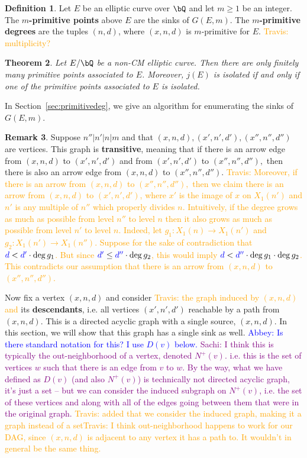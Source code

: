 \documentclass[11pt,reqno]{amsart}
\theoremstyle{plain}
\newtheorem{theorem}{Theorem}%
\theoremstyle{definition}
\newtheorem{remark}[theorem]{Remark}
\newtheorem{definition}[theorem]{Definition}
\newcommand{\Q}{\bQ}
\newcommand{\abbey}[1]{\textcolor{blue}{Abbey: #1}}
\newcommand{\sachi}[1]{\textcolor{purple}{Sachi: #1}}
\newcommand{\travis}[1]{\textcolor{orange}{Travis: #1}}
\newcommand{\abedit}[1]{{\color{blue} #1}}
\newcommand{\sedit}[1]{{\color{purple} #1}}
\begin{document}
\begin{definition}\label{def:mprimitive}
    Let $E$ be an elliptic curve over $\Q$ and let $m\geq 1$ be an integer. The \textbf{$m$-primitive points} above $E$ are the sinks \abedit{of} $G(E,m)$. The \textbf{$m$-primitive degrees} are the tuples $(n,d)$, where $(x,n,d)$ is $m$-primitive for $E$. \travis{multiplicity?}
\end{definition}

\abedit{
\begin{theorem}
    Let $E/\Q$ be a non-CM elliptic curve. Then there are only finitely many primitive points associated to $E$. Moreover, $j(E)$ is isolated if and only if one of the primitive points associated to $E$ is isolated.
\end{theorem}

}
In Section~\ref{sec:primitivedeg}, we give an algorithm for enumerating the sinks of $G(E,m)$.
\begin{remark}\label{Remark:Transitivity}
Suppose $n'' | n' | n | m$ and that $(x,n,d), (x',n',d'), (x'',n'',d'')$ are vertices. This graph is \textbf{transitive}, meaning that if there is an arrow \sedit{edge} from $(x,n,d)$ \sedit{to} $(x',n',d')$ and from $(x',n',d')$ to $(x'',n'',d''),$ then
there is also an arrow \sedit{edge} from $(x,n,d)$ to $(x'',n'',d'')$. \travis{Moreover, if there is an arrow from $(x,n,d)$ to $(x'',n'',d''),$ then we  claim there \abedit{is} an arrow from $(x,n,d)$ to $(x',n',d')$, \abedit{where $x'$ is the image of $x$ on $X_1(n')$ and $n'$ is any multiple of $n''$ which properly divides $n$}. Intuitively, if the degree grows as much as possible from level $n''$ to level $n$ then it also grows as much as possible from level $n'$ to level $n$. Indeed, let $g_1:X_1(n) \rightarrow X_1(n')$ and $g_2:X_1(n') \rightarrow X_1(n'')$. Suppose for the sake of contradiction that  $\abedit{d}<\abedit{d'}\cdot\deg g_1$. But since $\abedit{d'} \leq \abedit{d''} \cdot \deg g_2$, this would imply $\abedit{d}<\abedit{d''} \cdot\deg g_1\cdot \deg g_2 $. This contradicts our assumption that there is an arrow from $(x,n,d)$ to $(x'',n'',d'')$.}
\end{remark}


Now fix a vertex $(x,n,d)$ and consider \travis{the graph induced by $(x,n,d)$ and} its \textbf{descendants}, i.e. all vertices $(x',n',d')$ reachable by a path from $(x,n,d)$. This is a directed acyclic graph with a single source, $(x,n,d)$.  \abedit{In this section, we will show that this graph has a single sink as well.}    \abbey{Is there standard notation for this? I use $D(v)$ below.} \sachi{I think this is typically the out-neighborhood of a vertex, denoted $N^+(v)$. i.e. this is the set of vertices $w$ such that there is an edge from $v$ to $w$. By the way, what we have defined as $D(v)$ (and also $N^+(v)$) is technically not directed acyclic graph, it's just a set -- but we can consider the induced subgraph on $N^+(v)$, i.e. the set of these vertices and along with all of the edges going between them that were in the original graph.} \travis{added that we consider the induced graph, making it a graph instead of a set}\travis{I think out-neighborhood happens to work for our DAG, since $(x,n,d)$ is adjacent to any vertex it has a path to. It wouldn't in general be the same thing.}
\end{document}
